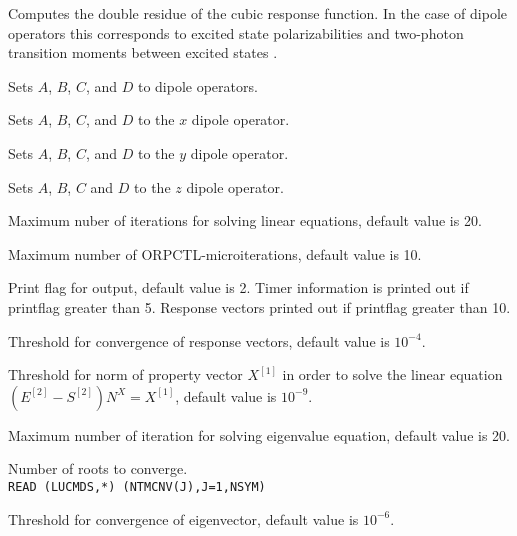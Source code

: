 \begin{description}
\item{}
Computes the double residue of the cubic
response function.
In the case of dipole operators this corresponds to excited
state polarizabilities and two-photon transition
moments
between excited states \cite{djpnylhajcp105}.

\item{}
Sets $A$, $B$, $C$, and $D$ to dipole operators.

\item{}
Sets $A$, $B$, $C$, and $D$ to the $x$ dipole operator.

\item{}
Sets $A$, $B$, $C$, and $D$ to the $y$ dipole operator.

\item{}
Sets $A$, $B$, $C$ and $D$ to the $z$ dipole operator.

\item{}
Maximum nuber of iterations for solving linear equations, default value is 20.

\item{}
Maximum number of ORPCTL-microiterations, default value is 10.

\item{}
Print flag for output, default value is 2. Timer information is printed
out if printflag greater than 5. Response vectors printed out if
printflag greater than 10.

\item{}
Threshold for convergence of response vectors, default value is $10^{-4}$.

\item{}
Threshold for norm of property vector $X^{[1]}$ in order to solve the linear
equation \\
$\left( E^{[2]} - S^{[2]} \right)N^{X} = X^{[1]}$, default
value is $10^{-9}$. 

\item{}
Maximum number of iteration for solving eigenvalue equation, default
value is 20.

\item{}
Number of roots to converge. \\
\verb|READ (LUCMDS,*) (NTMCNV(J),J=1,NSYM)|\\

\item{}
Threshold for convergence of eigenvector, default value is $10^{-6}$.

\end{description}


